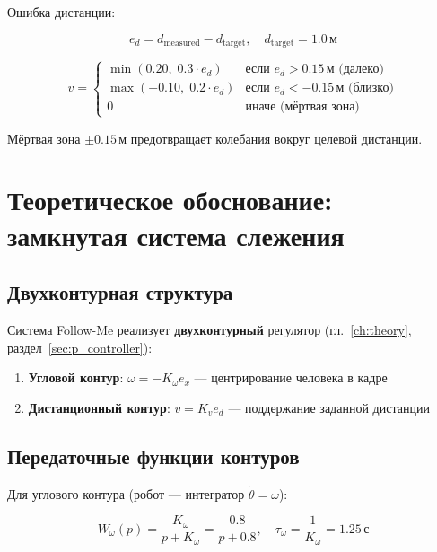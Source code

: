 Ошибка дистанции:

\begin{equation}
  e_d = d_{\text{measured}} - d_{\text{target}}, \quad d_{\text{target}} = 1.0\,\text{м}
  \label{eq:dist_error}
\end{equation}

\begin{equation}
  v = \begin{cases}
    \min(0.20,\; 0.3 \cdot e_d) & \text{если } e_d > 0.15\,\text{м (далеко)} \\
    \max(-0.10,\; 0.2 \cdot e_d) & \text{если } e_d < -0.15\,\text{м (близко)} \\
    0 & \text{иначе (мёртвая зона)}
  \end{cases}
  \label{eq:linear_p}
\end{equation}

Мёртвая зона $\pm 0.15\,\text{м}$ предотвращает колебания вокруг целевой дистанции.

\section{Теоретическое обоснование: замкнутая система слежения}

\subsection{Двухконтурная структура}

Система Follow-Me реализует \textbf{двухконтурный} регулятор
(гл.~\ref{ch:theory}, раздел~\ref{sec:p_controller}):

\begin{enumerate}
  \item \textbf{Угловой контур}: $\omega = -K_\omega e_x$ ---
    центрирование человека в кадре
  \item \textbf{Дистанционный контур}: $v = K_v e_d$ ---
    поддержание заданной дистанции
\end{enumerate}

\subsection{Передаточные функции контуров}

Для углового контура (робот --- интегратор $\dot{\theta} = \omega$):

\begin{equation}
  W_{\omega}(p) = \frac{K_\omega}{p + K_\omega} = \frac{0.8}{p + 0.8},
  \quad \tau_\omega = \frac{1}{K_\omega} = 1.25\,\text{с}
  \label{eq:follow_angular_tf}
\end{equation}

